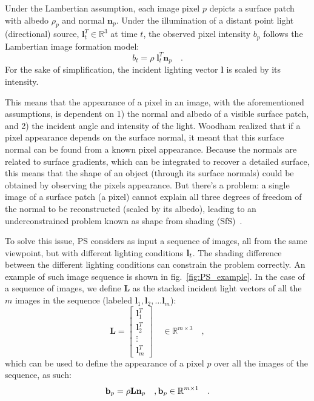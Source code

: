 Under the Lambertian assumption, each image pixel $p$ depicts a surface patch with albedo $\rho_p$ and normal $\mathbf{n}_p$. Under the illumination of a distant point light (directional) source, $\mathbf{l}_t^T \in \mathbb{R}^3$ at time $t$, the observed pixel intensity $b_p$ follows the Lambertian image formation model:
\begin{equation}
b_t =  \rho \; \mathbf{l}_t^T \mathbf{n}_p \quad.
\end{equation}
For the sake of simplification, the incident lighting vector $\mathbf{l}$ is scaled by its intensity.

This means that the appearance of a pixel in an image, with the aforementioned assumptions, is dependent on 1) the normal and albedo of a visible surface patch, and 2) the incident angle and intensity of the light. Woodham realized that if a pixel appearance depends on the surface normal, it meant that this surface normal can be found from a known pixel appearance. Because the normals are related to surface gradients, which can be integrated to recover a detailed surface, this means that the shape of an object (through its surface normals) could be obtained by observing the pixels appearance. But there's a problem: a single image of a surface patch (a pixel) cannot explain all three degrees of freedom of the normal to be reconstructed (scaled by its albedo), leading to an underconstrained problem known as shape from shading (SfS)~\cite{Horn1989}.

To solve this issue, PS considers as input a sequence of images, all from the same viewpoint, but with different lighting conditions ${\bf l}_t$. The shading difference between the different lighting conditions can constrain the problem correctly. An example of such image sequence is shown in fig.~\ref{fig:PS_example}. In the case of a sequence of images, we define $\mathbf{L}$ as the stacked incident light vectors of all the $m$ images in the sequence (labeled $\mathbf{l}_{1}, \mathbf{l}_{2}, \dots \mathbf{l}_{m}$):
\begin{equation}
\label{eq:Ldef}
\mathbf{L} =
\begin{bmatrix}
    \mathbf{l}_{1}^T \\
    \mathbf{l}_{2}^T \\
    \vdots \\
    \mathbf{l}_{m}^T
\end{bmatrix}
\quad
\in \mathbb{R}^{m \times 3} \quad,
\end{equation}
which can be used to define the appearance of a pixel $p$ over all the images of the sequence, as such:
\begin{equation}
\label{eq:lamb_refl}
\mathbf{b}_p =  \rho \mathbf{L} \mathbf{n}_p \quad, {\bf b}_p \in \mathbb{R}^{m \times 1} \quad.
\end{equation}

